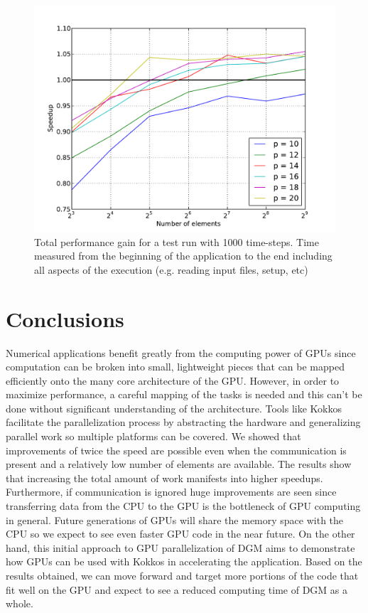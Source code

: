 \documentclass{ccr16}
\begin{document}
{        \begin{figure}[h]
            \centering
            \includegraphics[trim = {0in 0.3in 0in 0.3in}, width = 0.5 \textwidth]{./plots/PDBM_overall_performance.pdf}
            \caption{Total performance gain for a test run with 1000 time-steps. Time measured from the beginning of the application to the end including all aspects of the execution (e.g. reading input files, setup, etc)}
            \label{PDBM:fig:overall_performance}
        \end{figure}
    }

    \section{Conclusions}
    {
        \label{PDBM:sec:conclusions}

        Numerical applications benefit greatly from the computing power of GPUs since computation can be broken into small, lightweight pieces that can be mapped efficiently onto the many core architecture of the GPU. However, in order to maximize performance, a careful mapping of the tasks is needed and this can't be done without significant understanding of the architecture. Tools like Kokkos facilitate the parallelization process by abstracting the hardware and generalizing parallel work so multiple platforms can be covered. We showed that improvements of twice the speed are possible even when the communication is present and a relatively low number of elements are available. The results show that increasing the total amount of work manifests into higher speedups. Furthermore, if communication is ignored huge improvements are seen since transferring data from the CPU to the GPU is the bottleneck of GPU computing in general. Future generations of GPUs will share the memory space with the CPU so we expect to see even faster GPU code in the near future. On the other hand, this initial approach to GPU parallelization of DGM aims to demonstrate how GPUs can be used with Kokkos in accelerating the application. Based on the results obtained, we can move forward and target more portions of the code that fit well on the GPU and expect to see a reduced computing time of DGM as a whole.
    }

    
    

\end{document}
